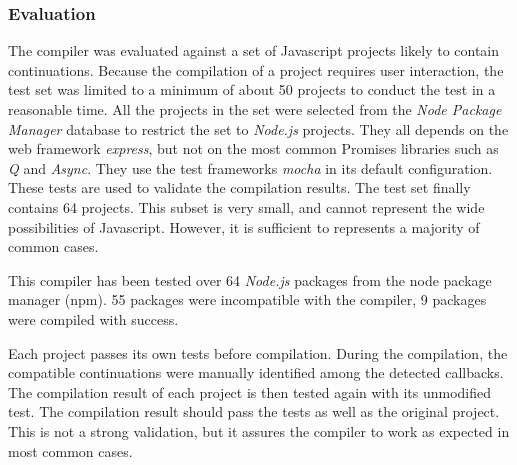 \subsubsection{Evaluation} \label{chapter5:due:evaluation}




The compiler was evaluated against a set of Javascript projects likely to contain continuations.
Because the compilation of a project requires user interaction, the test set was limited to a minimum of about \num{50} projects to conduct the test in a reasonable time.
All the projects in the set were selected from the \textit{Node Package Manager} database to restrict the set to \textit{Node.js} projects.
They all depends on the web framework \textit{express}, but not on the most common Promises libraries such as \textit{Q} and \textit{Async}.
They use the test frameworks \textit{mocha} in its default configuration.
These tests are used to validate the compilation results.
The test set finally contains 64 projects.
This subset is very small, and cannot represent the wide possibilities of Javascript.
However, it is sufficient to represents a majority of common cases.



This compiler has been tested over 64 \textit{Node.js} packages from the node package manager (npm).
55 packages were incompatible with the compiler, 9 packages were compiled with success.



Each project passes its own tests before compilation.
During the compilation, the compatible continuations were manually identified among the detected callbacks.
The compilation result of each project is then tested again with its unmodified test.
The compilation result should pass the tests as well as the original project.
This is not a strong validation, but it assures the compiler to work as expected in most common cases.

